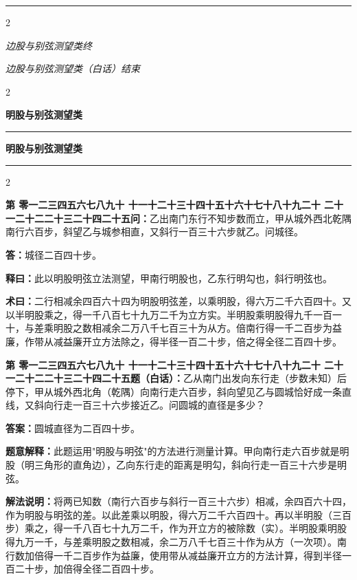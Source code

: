 \documentclass[10pt,a4paper]{article}
\newcommand{\longline}{\noindent\rule{\textwidth}{0.4pt}}
\newcounter{probnum}
\newcounter{probnumvol}[section]
\newcommand{\chnum}[1]{%
  \ifcase#1 零\or 一\or 二\or 三\or 四\or 五\or 六\or 七\or 八\or 九\or 十\or
    十一\or 十二\or 十三\or 十四\or 十五\or 十六\or 十七\or 十八\or 十九\or 二十\or
    二十一\or 二十二\or 二十三\or 二十四\or 二十五\fi}
\newcommand{\problemclassical}[1]{%
  \stepcounter{probnumvol}%
  \par\noindent
  \textcolor{classicalcolor}{\textbf{第\chnum{\value{probnumvol}}问：}}#1\par\smallskip
}
\newcommand{\problemmodern}[1]{%
  \par\noindent
  \textcolor{moderncolor}{\textbf{第\chnum{\value{probnumvol}}题（白话）：}}#1\par\smallskip
}
\newcommand{\answerclassical}[1]{%
  \par\noindent\textcolor{classicalcolor}{\textbf{答：}}#1\par
}
\newcommand{\answermodern}[1]{%
  \par\noindent\textcolor{moderncolor}{\textbf{答案：}}#1\par
}
\newcommand{\shiyiclassical}[1]{%
  \par\noindent\textcolor{classicalcolor}{\textbf{释曰：}}#1\par
}
\newcommand{\shiyimodern}[1]{%
  \par\noindent\textcolor{moderncolor}{\textbf{题意解释：}}#1\par
}
\newcommand{\shuyueclassical}[1]{%
  \par\noindent\textcolor{classicalcolor}{\textbf{术曰：}}#1\par
}
\newcommand{\shuyuemodern}[1]{%
  \par\noindent\textcolor{moderncolor}{\textbf{解法说明：}}#1\par
}
\newcommand{\volheaderclassical}[1]{%
  \begin{center}{\large\bfseries\color{volcolor} #1}\end{center}
  \vspace{0.3cm}
  \longline
  \vspace{0.3cm}
}
\newcommand{\volheadermodern}[1]{%
  \begin{center}{\large\bfseries\color{volcolor} #1}\end{center}
  \vspace{0.3cm}
  \longline
  \vspace{0.3cm}
}
\newcommand{\endclassical}[1]{%
  \vspace{0.3cm}
  \begin{center}\textit{#1}\end{center}
}
\newcommand{\endmodern}[1]{%
  \vspace{0.3cm}
  \begin{center}\textit{#1}\end{center}
}
\begin{document}
\vspace{0.5cm}
\longline
\begin{paracol}{2}
\endclassical{边股与别弦测望类终}
\switchcolumn
\endmodern{边股与别弦测望类（白话）结束}
\end{paracol}

\newpage

\setcounter{probnumvol}{0}

\begin{paracol}{2}

\volheaderclassical{明股与别弦测望类}

\switchcolumn

\volheadermodern{明股与别弦测望类}

\end{paracol}

\begin{paracol}{2}

\problemclassical{乙出南门东行不知步数而立，甲从城外西北乾隅南行六百步，斜望乙与城参相直，又斜行一百三十六步就乙。问城径。}

\answerclassical{城径二百四十步。}

\shiyiclassical{此以明股明弦立法测望，甲南行明股也，乙东行明勾也，斜行明弦也。}

\shuyueclassical{二行相减余四百六十四为明股明弦差，以乘明股，得六万二千六百四十。又以半明股乘之，得一千八百七十九万二千为立方实。半明股乘明股得九千一百一十，与差乘明股之数相减余二万八千七百三十为从方。倍南行得一千二百步为益廉，作带从减益廉开立方法除之，得半径一百二十步，倍之得全径二百四十步。}

\switchcolumn

\problemmodern{乙从南门出发向东行走（步数未知）后停下，甲从城外西北角（乾隅）向南行走六百步，斜向望见乙与圆城恰好成一条直线，又斜向行走一百三十六步接近乙。问圆城的直径是多少？}

\answermodern{圆城直径为二百四十步。}

\shiyimodern{此题运用"明股与明弦"的方法进行测量计算。甲向南行走六百步就是明股（明三角形的直角边），乙向东行走的距离是明勾，斜向行走一百三十六步是明弦。}

\shuyuemodern{将两已知数（南行六百步与斜行一百三十六步）相减，余四百六十四，作为明股与明弦的差。以此差乘以明股，得六万二千六百四十。再以半明股（三百步）乘之，得一千八百七十九万二千，作为开立方的被除数（实）。半明股乘明股得九万一千，与差乘明股之数相减，余二万八千七百三十作为从方（一次项）。南行数加倍得一千二百步作为益廉，使用带从减益廉开立方的方法计算，得到半径一百二十步，加倍得全径二百四十步。}

\end{paracol}
\end{document}
